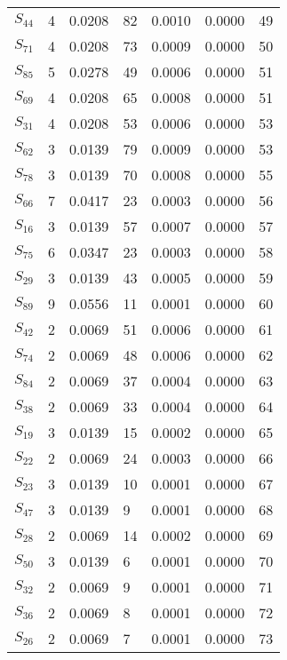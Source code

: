 \begin{xltabular}{\textwidth}{XXXXXXX}
  $S_{44}$ & 4 & 0.0208 & 82 & 0.0010 & 0.0000 & 49 \\ 
  $S_{71}$ & 4 & 0.0208 & 73 & 0.0009 & 0.0000 & 50 \\ 
  $S_{85}$ & 5 & 0.0278 & 49 & 0.0006 & 0.0000 & 51 \\ 
  $S_{69}$ & 4 & 0.0208 & 65 & 0.0008 & 0.0000 & 51 \\ 
  $S_{31}$ & 4 & 0.0208 & 53 & 0.0006 & 0.0000 & 53 \\ 
  $S_{62}$ & 3 & 0.0139 & 79 & 0.0009 & 0.0000 & 53 \\ 
  $S_{78}$ & 3 & 0.0139 & 70 & 0.0008 & 0.0000 & 55 \\ 
  $S_{66}$ & 7 & 0.0417 & 23 & 0.0003 & 0.0000 & 56 \\ 
  $S_{16}$ & 3 & 0.0139 & 57 & 0.0007 & 0.0000 & 57 \\ 
  $S_{75}$ & 6 & 0.0347 & 23 & 0.0003 & 0.0000 & 58 \\ 
  $S_{29}$ & 3 & 0.0139 & 43 & 0.0005 & 0.0000 & 59 \\ 
  $S_{89}$ & 9 & 0.0556 & 11 & 0.0001 & 0.0000 & 60 \\ 
  $S_{42}$ & 2 & 0.0069 & 51 & 0.0006 & 0.0000 & 61 \\ 
  $S_{74}$ & 2 & 0.0069 & 48 & 0.0006 & 0.0000 & 62 \\ 
  $S_{84}$ & 2 & 0.0069 & 37 & 0.0004 & 0.0000 & 63 \\ 
  $S_{38}$ & 2 & 0.0069 & 33 & 0.0004 & 0.0000 & 64 \\ 
  $S_{19}$ & 3 & 0.0139 & 15 & 0.0002 & 0.0000 & 65 \\ 
  $S_{22}$ & 2 & 0.0069 & 24 & 0.0003 & 0.0000 & 66 \\ 
  $S_{23}$ & 3 & 0.0139 & 10 & 0.0001 & 0.0000 & 67 \\ 
  $S_{47}$ & 3 & 0.0139 & 9 & 0.0001 & 0.0000 & 68 \\ 
  $S_{28}$ & 2 & 0.0069 & 14 & 0.0002 & 0.0000 & 69 \\ 
  $S_{50}$ & 3 & 0.0139 & 6 & 0.0001 & 0.0000 & 70 \\ 
  $S_{32}$ & 2 & 0.0069 & 9 & 0.0001 & 0.0000 & 71 \\ 
  $S_{36}$ & 2 & 0.0069 & 8 & 0.0001 & 0.0000 & 72 \\ 
  $S_{26}$ & 2 & 0.0069 & 7 & 0.0001 & 0.0000 & 73 \\ 

\end{xltabular}
